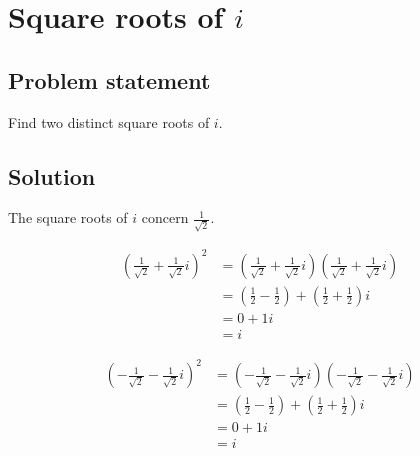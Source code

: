 \documentclass{article}
\begin{document}
\clearpage

\section{Square roots of $i$}
\subsection*{Problem statement}
Find two distinct square roots of $i$.

\subsection*{Solution}
The square roots of $i$ concern $\frac{1}{\sqrt{2}}$.

\begin{align*}
    (\frac{1}{\sqrt{2}}+\frac{1}{\sqrt{2}}i)^2&=(\frac{1}{\sqrt{2}}+\frac{1}{\sqrt{2}}i)(\frac{1}{\sqrt{2}}+\frac{1}{\sqrt{2}}i)\\
    &=(\frac{1}{2}-\frac{1}{2})+(\frac{1}{2}+\frac{1}{2})i\\
    &=0+1i\\
    &=i
\end{align*}

\begin{align*}
    (-\frac{1}{\sqrt{2}}-\frac{1}{\sqrt{2}}i)^2&=(-\frac{1}{\sqrt{2}}-\frac{1}{\sqrt{2}}i)(-\frac{1}{\sqrt{2}}-\frac{1}{\sqrt{2}}i)\\
    &=(\frac{1}{2}-\frac{1}{2})+(\frac{1}{2}+\frac{1}{2})i\\
    &=0+1i\\
    &=i
\end{align*}
\end{document}
